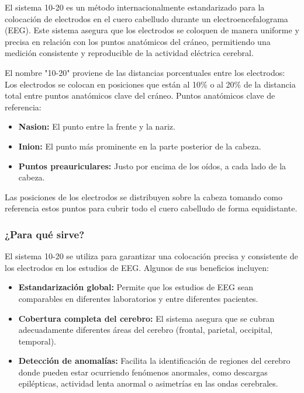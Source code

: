 \documentclass{article}
\begin{document}
El sistema 10-20 es un método internacionalmente estandarizado para la colocación de electrodos en el cuero cabelludo durante un electroencefalograma (EEG). Este sistema asegura que los electrodos se coloquen de manera uniforme y precisa en relación con los puntos anatómicos del cráneo, permitiendo una medición consistente y reproducible de la actividad eléctrica cerebral.

El nombre "10-20" proviene de las distancias porcentuales entre los electrodos: Los electrodos se colocan en posiciones que están al 10\% o al 20\% de la distancia total entre puntos anatómicos clave del cráneo.
Puntos anatómicos clave de referencia:
\begin{itemize}
    \item \textbf{Nasion:} El punto entre la frente y la nariz.
    \item \textbf{Inion:} El punto más prominente en la parte posterior de la cabeza.
    \item \textbf{Puntos preauriculares:} Justo por encima de los oídos, a cada lado de la cabeza.
\end{itemize}

Las posiciones de los electrodos se distribuyen sobre la cabeza tomando como referencia estos puntos para cubrir todo el cuero cabelludo de forma equidistante.

\subsubsection{¿Para qué sirve?}
El sistema 10-20 se utiliza para garantizar una colocación precisa y consistente de los electrodos en los estudios de EEG. Algunos de sus beneficios incluyen:

\begin{itemize}

    \item \textbf{Estandarización global:} Permite que los estudios de EEG sean comparables en diferentes laboratorios y entre diferentes pacientes.
    \item \textbf{Cobertura completa del cerebro:} El sistema asegura que se cubran adecuadamente diferentes áreas del cerebro (frontal, parietal, occipital, temporal).
    \item \textbf{Detección de anomalías:} Facilita la identificación de regiones del cerebro donde pueden estar ocurriendo fenómenos anormales, como descargas epilépticas, actividad lenta anormal o asimetrías en las ondas cerebrales.
    
\end{itemize}
\end{document}
